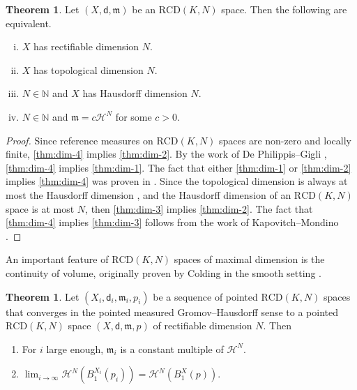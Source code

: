 \documentclass[12pt]{amsart}
\theoremstyle{definition}
\def\fnum{equation}
\newtheorem{theorem}[\fnum]{Theorem}
\numberwithin{equation}{section}
\newcommand{\rcd}{\text{RCD}}
\newcommand{\mm}{\mathfrak{m}}
\begin{document}
\begin{theorem} \label{thm:dim}
    Let $(X,\mathsf{d} ,\mm)$ be an $\rcd (K,N)$ space. Then the following are equivalent.
    \begin{enumerate}[i.]
        \item $X$ has rectifiable dimension $N$. \label{thm:dim-1}
        \item  $X$ has topological dimension $N$. \label{thm:dim-3}
        \item $N \in \mathbb{N}$ and $X$ has Hausdorff dimension $N$. \label{thm:dim-2}
        \item $N \in \mathbb{N}$ and $\mm = c \mathcal{H}^N$ for some $c>0$.\label{thm:dim-4}
    \end{enumerate}
\end{theorem}

\begin{proof}
Since reference measures on $\rcd (K,N)$ spaces are non-zero and locally finite, \eqref{thm:dim-4} implies \eqref{thm:dim-2}.  By the work of De Philippis--Gigli \cite[Theorem 1.12]{de-philippis-gigli},  \eqref{thm:dim-4} implies  \eqref{thm:dim-1}. The fact that either  \eqref{thm:dim-1} or  \eqref{thm:dim-2} implies \eqref{thm:dim-4} was proven in \cite[Theorem 2.20]{brena-gigli-honda-zhu}. Since the topological dimension is always at most the Hausdorff dimension \cite[Theorem VII 2]{hurewicz-wallman}, and the Hausdorff dimension of an $\rcd (K,N) $ space is at most $N$, then \eqref{thm:dim-3} implies \eqref{thm:dim-2}. The fact that \eqref{thm:dim-4} implies \eqref{thm:dim-3} follows from the work of Kapovitch--Mondino \cite[Theorem 1.7]{kapovitch-mondino}.
\end{proof}

 
 An important  feature of  $\rcd (K,N)$ spaces of maximal dimension is the continuity of volume, originally proven by Colding in the smooth setting \cite{colding}.

\begin{theorem}\label{thm:volume-continuity}
    Let $(X_i, \mathsf{d}_i, \mm_i, p_i )$ be a sequence of pointed  $\rcd (K, N)$ spaces that converges in the pointed measured Gromov--Hausdorff sense to a pointed $\rcd (K,N)$ space $(X, \mathsf{d}, \mm ,  p)$ of rectifiable dimension $N$. Then
    \begin{enumerate}[1.]
        \item  For $i$ large enough, $\mm_i$ is a constant multiple of  $\mathcal{H}^N$. \label{eq:non-collapsed}
        \item    $\lim_{i \to \infty }  \mathcal{H}^N( B_1^{X_i} (p_i) ) = \mathcal{H}^N ( B_1 ^X(p ) ).     $\label{eq:volume-continuity}
    \end{enumerate}
\end{theorem}
\end{document}
